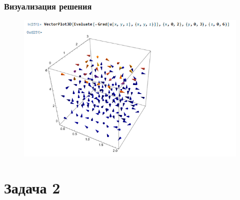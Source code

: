 \documentclass[11pt]{article}
\begin{document}
\subsubsection*{Визуализация решения}
\begin{figure}
    \centering
    \includegraphics[width=1\linewidth]{image1.png}
\end{figure}
\newpage
\section*{Задача 2}
\end{document}
